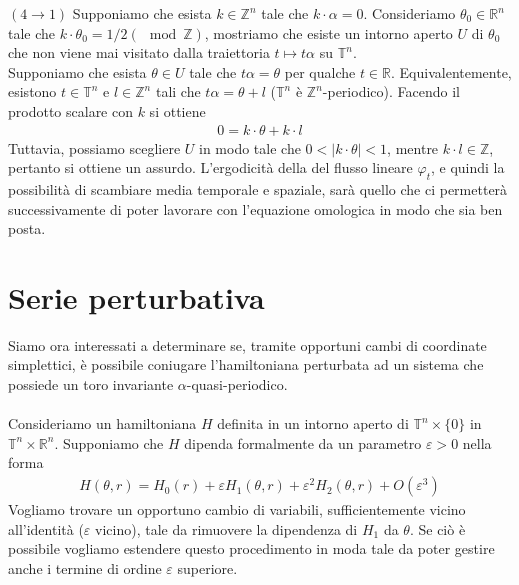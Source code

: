 \documentclass[twoside, 11pt]{amsbook}
\makeatletter
\newcommand{\0}{{(0)}}
\newcommand{\3}{{(3)}}
\theoremstyle{colonplain}
\theoremstyle{colondefinition}
\theoremstyle{colonremark}
\numberwithin{equation}{chapter}
\renewcommand{\proofname}{Dimostrazione}
\renewenvironment{proof}[1][\proofname]{\par
  \pushQED{\qed}%
  \normalfont \topsep6\p@\@plus6\p@\relax
  \trivlist
  \item[\hskip\labelsep\bfseries #1:]\ignorespaces
}{%
  \popQED\endtrivlist\@endpefalse
}
\makeatother
\begin{document}
\begin{proof}
$(4 \rightarrow 1)$ Supponiamo che esista $k \in \mathbb{Z}^n$ tale che $k \cdot \alpha = 0$. Consideriamo $\theta_0 \in \mathbb{R}^n$ tale che $k \cdot \theta_0 = 1/2 (\mod \mathbb{Z})$, mostriamo che esiste un intorno aperto $U$ di $\theta_0$ che non viene mai visitato dalla traiettoria $t \mapsto t\alpha$ su $\mathbb{T}^n$. \\
Supponiamo che esista $\theta \in U$ tale che $t\alpha = \theta$ per qualche $t \in \mathbb{R}$. Equivalentemente, esistono $t \in \mathbb{T}^n$ e $l \in \mathbb{Z}^n$ tali che $t\alpha = \theta + l$ ($\mathbb{T}^n$ è $\mathbb{Z}^n$-periodico). Facendo il prodotto scalare con $k$ si ottiene
\begin{align}
    0 = k \cdot \theta + k \cdot l
\end{align}
Tuttavia, possiamo scegliere $U$ in modo tale che $0 < |k \cdot \theta| < 1$, mentre $k \cdot l \in \mathbb{Z}$, pertanto si ottiene un assurdo.
\end{proof}
L'ergodicità della del flusso lineare $\varphi_t$, e quindi la possibilità di scambiare media temporale e spaziale, sarà quello che ci permetterà successivamente di poter lavorare con l'equazione omologica in modo che sia ben posta.

\section{Serie perturbativa}
Siamo ora interessati a determinare se, tramite opportuni cambi di coordinate simplettici, è possibile coniugare l'hamiltoniana perturbata ad un sistema che possiede un toro invariante $\alpha$-quasi-periodico. \\ \\
Consideriamo un hamiltoniana $H$ definita in un intorno aperto di $\mathbb{T}^n \times \{0\}$ in $\mathbb{T}^n \times \mathbb{R}^n$. Supponiamo che $H$ dipenda formalmente da un parametro $\varepsilon > 0$ nella forma
\begin{align}\label{PertSeries}
    H(\theta, r) = H_0(r) + \varepsilon H_1(\theta, r) + \varepsilon^2H_2(\theta, r) + O(\varepsilon^3) 
\end{align}
Vogliamo trovare un opportuno cambio di variabili, sufficientemente vicino all'identità ($\varepsilon$ vicino), tale da rimuovere la dipendenza di $H_1$ da $\theta$. Se ciò è possibile vogliamo estendere questo procedimento in moda tale da poter gestire anche i termine di ordine $\varepsilon$ superiore.
\end{document}
